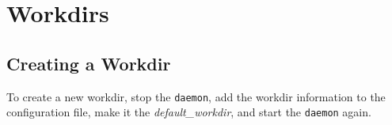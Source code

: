 \section{Workdirs}

\subsection{Creating a Workdir}
To create a new workdir, stop the \texttt{daemon}, add the workdir
information to the configuration file, make it
the \textsl{default\_workdir}, and start the \texttt{daemon} again.
